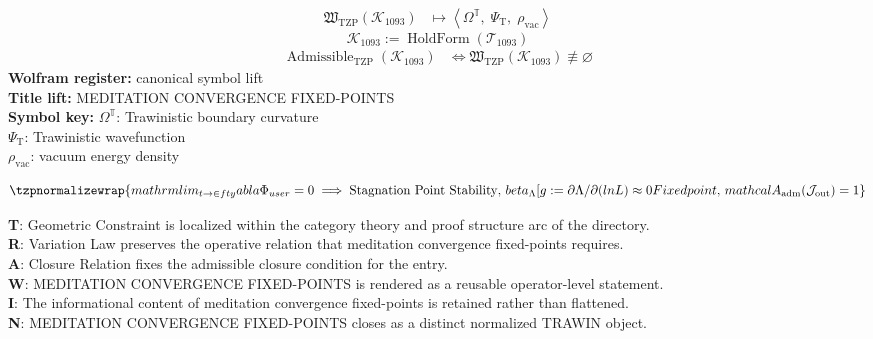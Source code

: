 \noindent
\begin{minipage}[t]{0.48\linewidth}
\begingroup
\small
\[
\begin{aligned}
\mathfrak{W}_{\mathrm{TZP}}\!\left(\mathcal{K}_{1093}\right)
&\longmapsto
\left\langle \Omega^{\mathbb{T}},\; \Psi_{\mathrm{T}},\; \rho_{\mathrm{vac}} \right\rangle
\end{aligned}
\]
\[
\mathcal{K}_{1093}
:=
\operatorname{HoldForm}\!\left(\mathcal{T}_{1093}\right)
\]
\[
\begin{aligned}
\operatorname{Admissible}_{\mathrm{TZP}}\!\left(\mathcal{K}_{1093}\right)
&\Longleftrightarrow
\mathfrak{W}_{\mathrm{TZP}}\!\left(\mathcal{K}_{1093}\right)\not\equiv\varnothing
\end{aligned}
\]
\textbf{Wolfram register:} canonical symbol lift\\
\textbf{Title lift:} MEDITATION CONVERGENCE FIXED-POINTS\\
\textbf{Symbol key:} \(\Omega^{\mathbb{T}}\): Trawinistic boundary curvature\\ \(\Psi_{\mathrm{T}}\): Trawinistic wavefunction\\ \(\rho_{\mathrm{vac}}\): vacuum energy density
\par
\endgroup
\end{minipage}\hfill
\begin{minipage}[t]{0.48\linewidth}
\[
\tzpnormalizewrap{mathrm{lim}_{t \to \in fty}  abla \Phi_{user} = 0 \implies \text{Stagnation Point Stability},\,beta_\Lambda[g := \partial\Lambda/\partial(ln L) \approx 0 Fixed point,\,mathcal{A}_{\mathrm{adm}}\!\left(\mathcal{J}_{\mathrm{out}}\right)=1}
\]

\small
\textbf{T}: Geometric Constraint is localized within the category theory and proof structure arc of the directory.\\
\textbf{R}: Variation Law preserves the operative relation that meditation convergence fixed-points requires.\\
\textbf{A}: Closure Relation fixes the admissible closure condition for the entry.\\
\textbf{W}: MEDITATION CONVERGENCE FIXED-POINTS is rendered as a reusable operator-level statement.\\
\textbf{I}: The informational content of meditation convergence fixed-points is retained rather than flattened.\\
\textbf{N}: MEDITATION CONVERGENCE FIXED-POINTS closes as a distinct normalized TRAWIN object.
\normalsize
\end{minipage}

